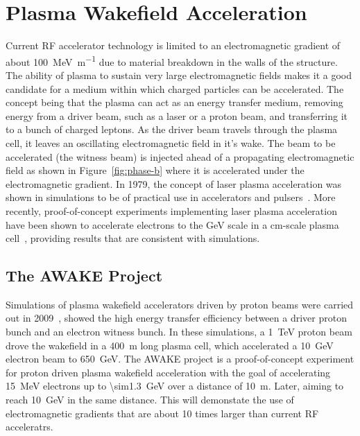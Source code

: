 
\section{Plasma Wakefield Acceleration}

Current RF accelerator technology is limited to an electromagnetic gradient of
about \SI{100}{\mega\electronvolt\per\meter} due to material breakdown in the
walls of the structure.  The ability of plasma to sustain very large
electromagnetic fields makes it a good candidate for a medium within which
charged particles can be accelerated. The concept being that the plasma can act
as an energy transfer medium, removing energy from a driver beam, such as a
laser or a proton beam, and transferring it to a bunch of charged leptons.  As
the driver beam travels through the plasma cell, it leaves an oscillating
electromagnetic field in it's wake. The beam to be accelerated (the witness
beam) is injected ahead of a propagating electromagnetic field as shown in
Figure~\ref{fig:phase-b} where it is accelerated under the electromagnetic
gradient.  In 1979, the concept of laser plasma acceleration was shown in
simulations to be of practical use in accelerators and
pulsers~\cite{Tajima:1979bn}. More recently, proof-of-concept experiments
implementing laser plasma acceleration have been shown to accelerate electrons
to the \si{\giga\electronvolt} scale in a \si{\centi\metre}-scale plasma
cell~\cite{Lu:2006nz,Leemans:2006dx}, providing results that are consistent with
simulations.


\subsection{The AWAKE Project}

Simulations of plasma wakefield accelerators driven by proton beams were
carried out in \num{2009}~\cite{Caldwell2008ak}, showed the high energy transfer
efficiency between a driver proton bunch and an electron witness bunch. In these
simulations, a \SI{1}{\tera\electronvolt} proton beam drove the wakefield in a
\SI{400}{\meter} long plasma cell, which accelerated a
\SI{10}{\giga\electronvolt} electron beam to \SI{650}{\giga\electronvolt}.  The
AWAKE project is a proof-of-concept experiment for proton driven plasma
wakefield acceleration with the goal of accelerating \SI{15}{\mega\electronvolt}
electrons up to \SI{\sim1.3}{\giga\electronvolt} over a distance of
\SI{10}{\meter}. Later, aiming to reach \SI{10}{\giga\electronvolt} in the same
distance. This will demonstate the use of electromagnetic gradients that are
about 10 times larger than current RF acceleratrs.

